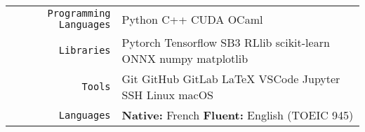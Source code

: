 \documentclass[
    10pt,
    A4,
    english,
    draft = false,
    twoside = false,
]{article}
\begin{document}
	\tab \begin{tabular}{r p{}}
		\texttt{\large Programming Languages} & Python \cvContactSep
		C++ \cvContactSep CUDA \cvContactSep OCaml\\
		\texttt{\large Libraries} & Pytorch \cvContactSep Tensorflow
		\cvContactSep SB3 \cvContactSep RLlib \cvContactSep
		scikit-learn \cvContactSep ONNX \cvContactSep numpy \cvContactSep
		matplotlib\\
		\texttt{\large Tools} & Git \cvContactSep GitHub \cvContactSep GitLab \cvContactSep \LaTeX \cvContactSep
		VSCode \cvContactSep Jupyter \cvContactSep SSH \cvContactSep Linux
		\cvContactSep macOS\\
		\texttt{\large Languages} & \textbf{Native:} French \cvContactSep \textbf{Fluent:} English (TOEIC 945)\\
	\end{tabular}\\~\\

	
	
	 
	
\end{document}
